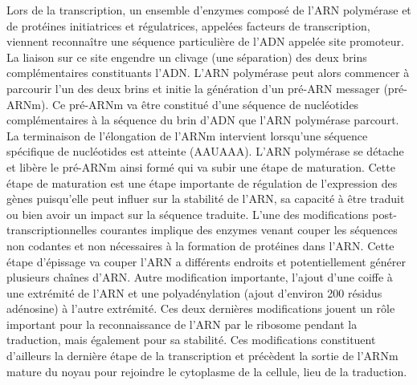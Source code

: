 


Lors de la transcription, un ensemble d'enzymes composé de l'ARN polymérase et de protéines initiatrices et régulatrices, appelées facteurs de transcription, viennent reconnaître une séquence particulière de l'ADN appelée site promoteur. La liaison sur ce site engendre un clivage (une séparation) des deux brins complémentaires constituants l'ADN. 
L'ARN polymérase peut alors commencer à parcourir l'un des deux brins et initie la génération d'un pré-ARN messager (pré-ARNm). Ce pré-ARNm va être constitué d'une séquence de nucléotides complémentaires à la séquence du brin d'ADN que l'ARN polymérase parcourt. La terminaison de l'élongation de l'ARNm intervient lorsqu’une séquence spécifique de nucléotides est atteinte (AAUAAA). 
L'ARN polymérase se détache et libère le pré-ARNm ainsi formé qui va subir une étape de maturation. Cette étape de maturation est une étape importante de régulation de l'expression des gènes puisqu'elle peut influer sur la stabilité de l'ARN, sa capacité à être traduit ou bien avoir un impact sur la séquence traduite. 
L'une des modifications post-transcriptionnelles courantes implique des enzymes venant couper les séquences non codantes et non nécessaires à la formation de protéines dans l'ARN. Cette étape d'épissage va couper l'ARN a différents endroits et potentiellement générer plusieurs chaînes d'ARN. Autre modification importante, l'ajout d'une coiffe à une extrémité de l'ARN et une polyadénylation (ajout d'environ 200 résidus adénosine) à l'autre extrémité. Ces deux dernières modifications jouent un rôle important pour la reconnaissance de l'ARN par le ribosome pendant la traduction, mais également pour sa stabilité. Ces modifications constituent d'ailleurs la dernière étape de la transcription et précèdent la sortie de l'ARNm mature du noyau pour rejoindre le cytoplasme de la cellule, lieu de la traduction.


